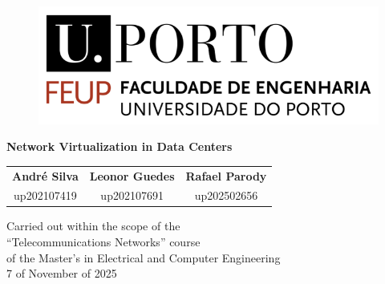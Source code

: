 \documentclass[a4paper, 11pt, twoside]{article}
\begin{document}
\begin{titlepage} %

    \begin{center} %
        

        \vspace{50pt}
    
        \begin{figure}[h] %
            \centering
            \includegraphics[scale = 1]{Figures/feup.png}
        \end{figure}
    
        \vspace{50pt} %
    
        \LARGE{\textbf{Network Virtualization in Data Centers}} \par 

        \vspace{50pt}

        \normalsize{ 
        \begin{tabular}{ccc}
            \textbf{André Silva} & \textbf{Leonor Guedes} & \textbf{Rafael Parody} \\
            up202107419 & up202107691 & up202502656 \\
        \end{tabular}
        }

        \mbox{}
        \vfill
        
        \normalsize{ 
        Carried out within the scope of the\\
        “Telecommunications Networks” course\\
        of the Master's in Electrical and Computer Engineering\\
        }
        \vspace{50pt}
        \normalsize{7 of November of 2025}


        
    \end{center}

\end{titlepage}
\end{document}
